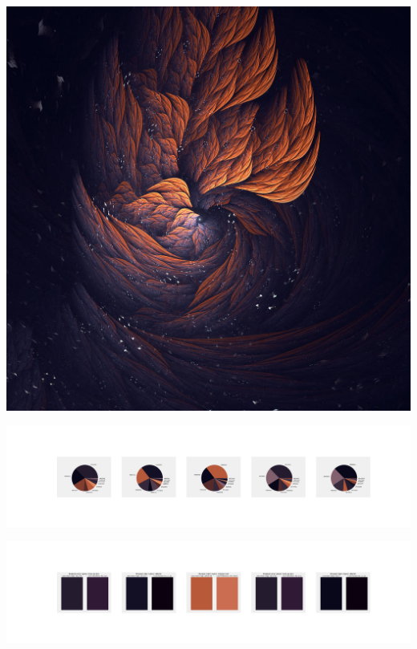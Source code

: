 \documentclass[11pt]{article}
\begin{document}
\begin{landscape}
    \begin{center}
    \includegraphics[width=\textwidth]{./nbimg/file (196).jpg}
    \end{center}

    \begin{center}
    \includegraphics[width=250mm]{./nbimg/pie-107.jpg}
    \end{center}

    \begin{center}
    \includegraphics[width=250mm]{./nbimg/peak-107.jpg}
    \end{center}
    


\end{landscape}
\end{document}
